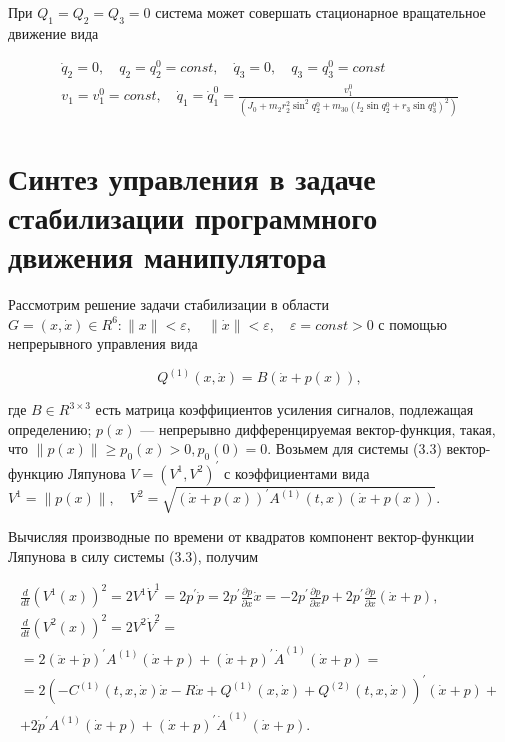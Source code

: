   При $Q_1 = Q_2 = Q_3 = 0$ система может совершать стационарное вращательное движение вида 
  
  \begin{equation*}
  \begin{array}{c}
  \displaystyle \dot q_2 = 0, \quad q_2 = q_2^0 = const, \quad \dot q_3 = 0, \quad q_3 = q_3^0 = const \\
  \displaystyle v_1 = v_1^0 = const, \quad \dot q_1 = \dot q_1^0 = \frac{v_1^0}{(J_0 + m_2 r_2^2 \sin^2 q_2^0 + m_{30} (l_2 \sin q_2^0 + r_3 \sin q_3^0)^2)}
  \end{array}
  \end{equation*} 
  
 
  \section{Синтез управления в задаче стабилизации программного движения манипулятора}%
 Рассмотрим решение задачи стабилизации в области $G = {(x, \dot x) \in R^6 : \|x\| < \varepsilon, \quad \|\dot x \| < \varepsilon, \quad \varepsilon = const>0}$
 с помощью непрерывного управления вида
 
 \begin{equation}
  Q^{(1)} (x, \dot x) = B(\dot x + p(x)),
 \end{equation}
 
 где $B \in R^{3 \times 3}$ есть матрица коэффициентов усиления сигналов, подлежащая определению; $p(x)$ --- непрерывно дифференцируемая вектор-функция, такая, что $\| p(x) \| \ge p_0(x) > 0, p_0(0) = 0$.
 Возьмем для системы (3.3) вектор-функцию Ляпунова $V = (V^1, V^2)^{'}$ с коэффициентами вида $V^1 = \|p(x)\|, \quad V^2 = \sqrt{(\dot x + p(x))^{'} A^{(1)} (t, x) (\dot x + p(x))}$.
 
 Вычисляя производные по времени от квадратов компонент вектор-функции Ляпунова  в силу системы (3.3), получим 
 
 \begin{equation*}
 \begin{array}{c}
 \displaystyle \frac{d}{dt} (V^1(x))^2 = 2 V^1 \dot V^1 = 2 p^{'} \dot p = 2 p^{'} \frac{\partial p }{\partial x} \dot x = -2 p^{'} \frac{\partial p }{\partial x} p + 2 p^{'} \frac{\partial p }{\partial x}(\dot x + p),\\
    \displaystyle \frac{d}{dt} (V^2(x))^2 = 2 V^2 \dot V^2 =\\
   \displaystyle = 2(\ddot x + \dot p)^{'} A^{(1)} (\dot x + p) + (\dot x + p)^{'} \dot A^{(1)} (\dot x + p) =\\
   \displaystyle = 2(- C^{(1)}(t, x, \dot x) \dot x - R \dot x + Q^{(1)}(x, \dot x) + Q^{(2)}(t, x, \dot x))^{'} (\dot x + p) +\\
   \displaystyle + 2 \dot p^{'} A^{(1)} (\dot x + p) + (\dot x + p)^{'} \dot A^{(1)} (\dot x + p).
 \end{array}
 \end{equation*}
 

